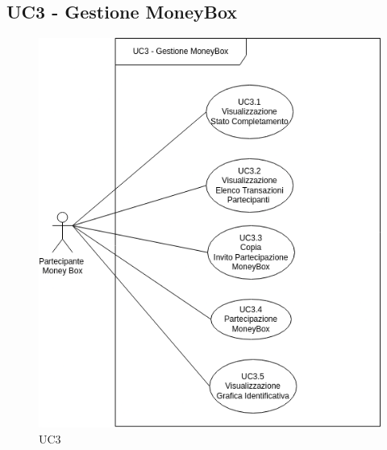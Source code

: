 \subsection{UC3 - Gestione MoneyBox}\label{subsection: UC3}

\begin{figure}[H]
    \centering
    \includegraphics[scale=0.7]{immagini/UC3.png}
    \caption{UC3}
\end{figure}

